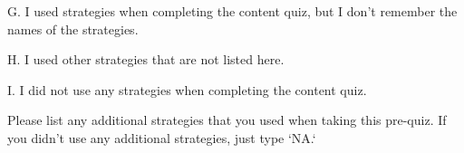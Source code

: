 \documentclass{ximera}
\begin{document}
\begin{problem}
    G. I used strategies when completing the content quiz, but I don't remember the names of the strategies.

    \begin{multipleChoice}
    \end{multipleChoice}
    
    H. I used other strategies that are not listed here.

    \begin{multipleChoice}
    \end{multipleChoice}
    
    I. I did not use any strategies when completing the content quiz.

    \begin{multipleChoice}
    \end{multipleChoice}

\end{problem}


\begin{problem}
    Please list any additional strategies that you used when taking this pre-quiz. If you didn't use any additional strategies, just type `NA.`
   \begin{freeResponse}
   \end{freeResponse}
\end{problem}



%
\end{document}
